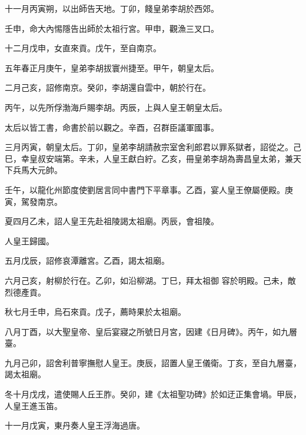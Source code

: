 \begin{pinyinscope}
 十一月丙寅朔，以出師告天地。丁卯，餞皇弟李胡於西郊。



 壬申，命大內惕隱告出師於太祖行宮。甲申，觀漁三叉口。



 十二月戊申，女直來貢。戊午，至自南京。



 五年春正月庚午，皇弟李胡拔寰州捷至。甲午，朝皇太后。



 二月己亥，詔修南京。癸卯，李胡還自雲中，朝於行在。



 丙午，以先所俘渤海戶賜李胡。丙辰，上與人皇王朝皇太后。



 太后以皆工書，命書於前以觀之。辛酉，召群臣議軍國事。



 三月丙寅，朝皇太后。丁卯，皇弟李胡請赦宗室舍利郎君以罪系獄者，詔從之。己巳，幸皇叔安端第。辛未，人皇王獻白紵。乙亥，冊皇弟李胡為壽昌皇太弟，兼天下兵馬大元帥。



 壬午，以龍化州節度使劉居言同中書門下平章事。乙酉，宴人皇王僚屬便殿。庚寅，駕發南京。



 夏四月乙未，詔人皇王先赴祖陵謁太祖廟。丙辰，會祖陵。



 人皇王歸國。



 五月戊辰，詔修哀潭離宮。乙酉，謁太祖廟。



 六月己亥，射柳於行在。乙卯，如沿柳湖。丁巳，拜太祖御
 容於明殿。己未，敵烈德產貢。



 秋七月壬申，烏石來貢。戊子，薦時果於太祖廟。



 八月丁酉，以大聖皇帝、皇后宴寢之所號日月宮，因建《日月碑》。丙午，如九層臺。



 九月己卯，詔舍利普寧撫慰人皇王。庚辰，詔置人皇王儀衛。丁亥，至自九層臺，謁太祖廟。



 冬十月戊戌，遣使賜人丘王胙。癸卯，建《太祖聖功碑》於如迂正集會堝。甲辰，人皇王進玉笛。



 十一月戊寅，東丹奏人皇王浮海過唐。




\end{pinyinscope}
